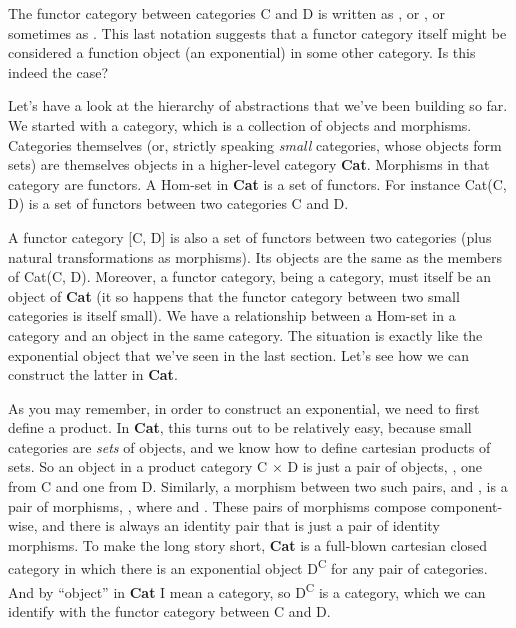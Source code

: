 The functor category between categories C and D is written as
, or \code{{[}C, D{]}}, or sometimes as
. This last notation suggests that a functor category itself
might be considered a function object (an exponential) in some other
category. Is this indeed the case?

Let's have a look at the hierarchy of abstractions that we've been
building so far. We started with a category, which is a collection of
objects and morphisms. Categories themselves (or, strictly speaking
\emph{small} categories, whose objects form sets) are themselves objects
in a higher-level category \textbf{Cat}. Morphisms in that category are
functors. A Hom-set in \textbf{Cat} is a set of functors. For instance
Cat(C, D) is a set of functors between two categories C and D.

\begin{figure}
\centering
{}
\end{figure}

A functor category {[}C, D{]} is also a set of functors between two
categories (plus natural transformations as morphisms). Its objects are
the same as the members of Cat(C, D). Moreover, a functor category,
being a category, must itself be an object of \textbf{Cat} (it so
happens that the functor category between two small categories is itself
small). We have a relationship between a Hom-set in a category and an
object in the same category. The situation is exactly like the
exponential object that we've seen in the last section. Let's see how we
can construct the latter in \textbf{Cat}.

As you may remember, in order to construct an exponential, we need to
first define a product. In \textbf{Cat}, this turns out to be relatively
easy, because small categories are \emph{sets} of objects, and we know
how to define cartesian products of sets. So an object in a product
category C × D is just a pair of objects, , one from C
and one from D. Similarly, a morphism between two such pairs,
 and , is a pair of
morphisms, , where
 and
. These pairs of morphisms
compose component-wise, and there is always an identity pair that is
just a pair of identity morphisms. To make the long story short,
\textbf{Cat} is a full-blown cartesian closed category in which there is
an exponential object D\textsuperscript{C} for any pair of categories.
And by ``object'' in \textbf{Cat} I mean a category, so
D\textsuperscript{C} is a category, which we can identify with the
functor category between C and D.

